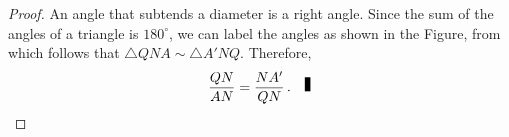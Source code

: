 \begin{proof}
An angle that subtends a diameter is a right angle. Since the sum of the angles of a triangle is $180^\circ$, we can label the angles as shown in the Figure, from which follows that $\triangle QNA \sim\triangle A'NQ$. Therefore,
\[
\frac{QN}{AN} = \frac{NA'}{QN}\,.\fqed
\]
\end{proof}


%
%
%
%
%
%
%

%
%

